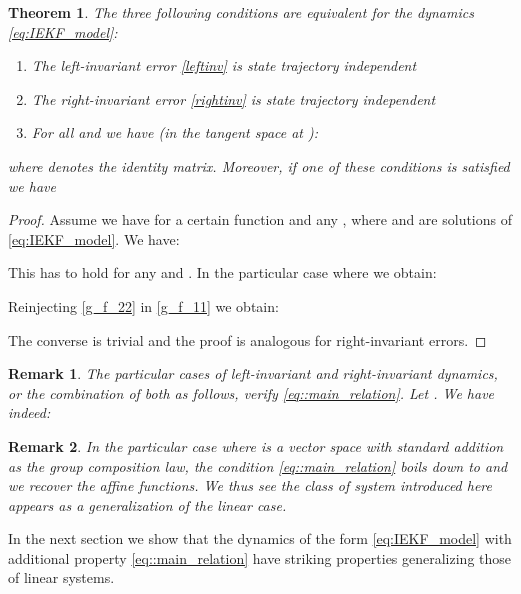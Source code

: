 \documentclass[a4paper,12pt,onecolumn]{article}
\newtheorem{thm}{Theorem}
\newtheorem{rem}{Remark}
\begin{document}
\begin{thm}
\label{thm::CNS}
 The three following conditions are equivalent for the dynamics \eqref{eq:IEKF_model}:
\begin{enumerate}[i]
\item The left-invariant error \eqref{leftinv} is state trajectory independent
\item The right-invariant error \eqref{rightinv} is state trajectory independent
\item For all  and  we have (in the tangent space at ):

\end{enumerate}
where  denotes the identity matrix. Moreover, if one of these conditions is satisfied we have 

\end{thm}

\begin{proof}
Assume we have  for a certain function  and any  , where  and  are solutions of \eqref{eq:IEKF_model}. We have:

This has to hold for any  and . In the particular case where  we obtain:

Reinjecting \eqref{g_f_22} in \eqref{g_f_11} we obtain:

The converse is trivial and the proof is analogous for right-invariant errors.
\end{proof}

\begin{rem}
The particular cases of left-invariant and right-invariant dynamics, or the combination of both as follows, verify \eqref{eq::main_relation}. Let . We have indeed:

\end{rem}

\begin{rem}
In the particular case where  is a vector space with  standard addition as the group composition law,  the condition \eqref{eq::main_relation} boils down to  and we recover the affine functions. We thus see the class of system introduced here  appears as a generalization of the linear case. 
\end{rem}




In the next section we show that the dynamics of the form \eqref{eq:IEKF_model} with additional property  \eqref{eq::main_relation} have striking properties  generalizing those of linear systems. 
\end{document}
